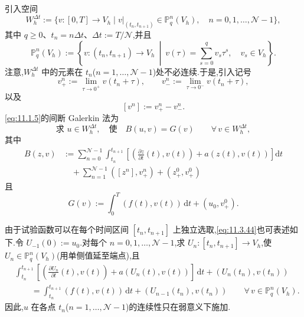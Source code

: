引入空间
\begin{equation}\label{eq:11.3.40}
  W_h^{\Delta t}:=\{v\colon[0,T]\to V_h\mid
     v|_{(t_n,t_{n+1})}\in\mathbb P_q^n(V_h),\quad n=0,1,\ldots,\mathcal N-1\},
\end{equation}
其中 \(q\ge0\)、\(t_n=n\Delta t\)、\(\Delta t:=T/\mathcal N\),并且
\begin{equation}\label{eq:11.3.41}
  \mathbb P_q^n(V_h):=\left\{v\colon(t_n,t_{n+1})\to V_h\ \middle|\
          v(\tau)=\sum_{s=0}^q v_s\tau^s,\quad v_s\in V_h\right\}.
\end{equation}
注意,\(W_h^{\Delta t}\) 中的元素在 \(t_n\)(\(n=1,\ldots,\mathcal N-1\))处不必连续.于是,引入记号
\begin{equation}\label{eq:11.3.42}
  v_+^n:=\lim_{\tau\to0^+}v(t_n+\tau),\qquad
  v_-^n:=\lim_{\tau\to0^-}v(t_n+\tau),
\end{equation}
以及
\begin{equation}\label{eq:11.3.43}
  [v^n]:=v_+^n-v_-^n.
\end{equation}
\eqref{eq:11.1.5}的间断 Galerkin 法为
\begin{equation}\label{eq:11.3.44}
  \text{求 }u\in W_h^{\Delta t},\quad\text{使}\quad
    B(u,v)=G(v)\qquad\forall\,v\in W_h^{\Delta t},
\end{equation}
其中
\begin{equation}\label{eq:11.3.45}
  \begin{aligned}
    B(z,v)
     &:=\sum_{n=0}^{\mathcal N-1}\int_{t_n}^{t_{n+1}}\left[
         \left(\frac{\partial z}{\partial t}(t),v(t)\right)+a(z(t),v(t))\right]\mathrm dt\\
     &\quad+\sum_{n=1}^{\mathcal N-1}([z^n],v_+^n)+(z_+^0,v_+^0)
  \end{aligned}
\end{equation}
且
\begin{equation}\label{eq:11.3.46}
  G(v):=\int_0^T(f(t),v(t))\,\mathrm dt+(u_0,v_+^0).
\end{equation}

由于试验函数可以在每个时间区间 \([t_n,t_{n+1}]\) 上独立选取,\eqref{eq:11.3.44}也可表述如下.令 \(U_{-1}(0):=u_0\).对每个 \(n=0,1,\ldots,\mathcal N-1\),求 \(U_n\colon[t_n,t_{n+1}]\to V_h\),使 \(U_n\in\mathbb P_q^n(V_h)\)(用单侧值延至端点),且
\begin{equation}\label{eq:11.3.47}
  \begin{aligned}
    &\int_{t_n}^{t_{n+1}}\left[
        \left(\frac{\partial U_n}{\partial t}(t),v(t)\right)+a(U_n(t),v(t))\right]\,\mathrm dt
          +(U_n(t_n),v(t_n))\\
    &\qquad=\int_{t_n}^{t_{n+1}}(f(t),v(t))\,\mathrm dt
                    +(U_{n-1}(t_n),v(t_n))
                \qquad\forall\,v\in\mathbb P_q^n(V_h).
  \end{aligned}
\end{equation}
因此,\(u\) 在各点 \(t_n\)(\(n=1,\ldots,\mathcal N-1\))的连续性只在弱意义下施加.


